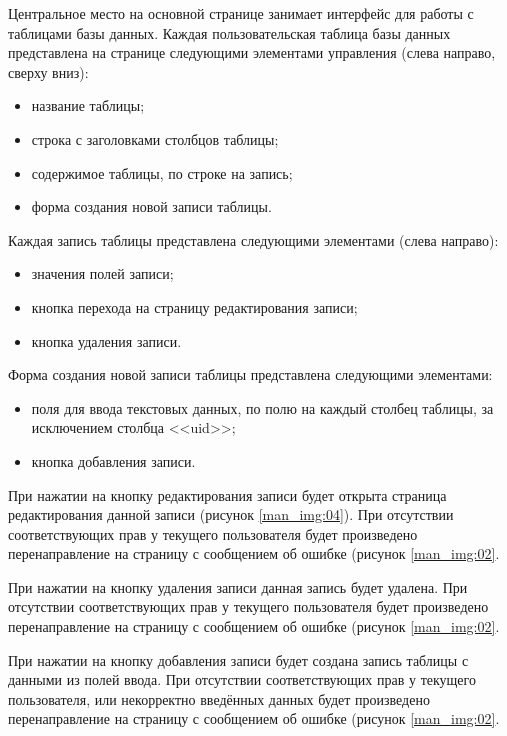 Центральное место на основной странице занимает интерфейс для работы с таблицами базы данных. Каждая пользовательская таблица базы данных представлена на странице следующими элементами управления (слева направо, сверху вниз):
\begin{itemize}
    \item название таблицы;
    \item строка с заголовками столбцов таблицы;
    \item содержимое таблицы, по строке на запись;
    \item форма создания новой записи таблицы.
\end{itemize}

Каждая запись таблицы представлена следующими элементами (слева направо):
\begin{itemize}
    \item значения полей записи;
    \item кнопка перехода на страницу редактирования записи;
    \item кнопка удаления записи.
\end{itemize}

Форма создания новой записи таблицы представлена следующими элементами:
\begin{itemize}
    \item поля для ввода текстовых данных, по полю на каждый столбец таблицы, за исключением столбца <<uid>>;
    \item кнопка добавления записи.
\end{itemize}

При нажатии на кнопку редактирования записи будет открыта страница редактирования данной записи (рисунок \ref{man_img:04}). При отсутствии соответствующих прав у текущего пользователя будет произведено перенаправление на страницу с сообщением об ошибке (рисунок \ref{man_img:02}.\par

При нажатии на кнопку удаления записи данная запись будет удалена. При отсутствии соответствующих прав у текущего пользователя будет произведено перенаправление на страницу с сообщением об ошибке (рисунок \ref{man_img:02}.\par

При нажатии на кнопку добавления записи будет создана запись таблицы с данными из полей ввода. При отсутствии соответствующих прав у текущего пользователя, или некорректно введённых данных будет произведено перенаправление на страницу с сообщением об ошибке (рисунок \ref{man_img:02}.\par

